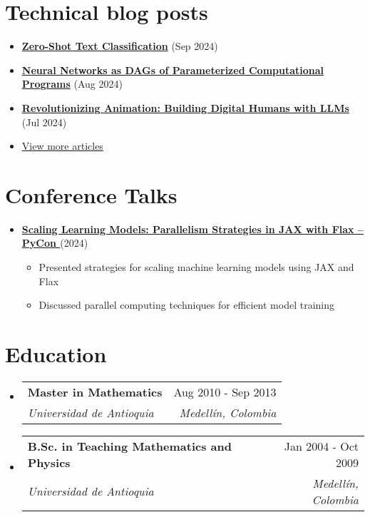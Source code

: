 \documentclass[letterpaper,11pt]{article}
\makeatletter
\newcommand{\resumeSubheading}[4]{
  \vspace{-2pt}
  \item[]
  \begin{tabular*}{\textwidth}{@{\extracolsep{\fill}}l r}
    \textbf{#1} & #2 \\
    \textit{#3} & \textit{#4} \\
  \end{tabular*}
  \vspace{-5pt}
}
\newcommand{\normalfaExternalLink}{{\mdseries\faExternalLink}}
\newcommand{\normalfaYoutube}{{\mdseries\faYoutube}}
\makeatother
\begin{document}
\section{Technical blog posts}
\begin{itemize}[leftmargin=*, itemsep=0pt]
    \item \textbf{\href{https://www.asanchezyali.com/blog/ai/20240917ZeroShot}{Zero-Shot Text Classification}} (Sep 2024)
    \item \textbf{\href{https://www.asanchezyali.com/blog/differentiable-programming/20240923DifferentiablePrograms}{Neural Networks as DAGs of Parameterized Computational Programs}} (Aug 2024)
    \item \textbf{\href{https://monadical.com/posts/build-a-digital-human-with-large-language-models.html}{Revolutionizing Animation: Building Digital Humans with LLMs}} (Jul 2024)
    \item \href{https://www.asanchezyali.com/}{View more articles \normalfaExternalLink}
\end{itemize}

\section{Conference Talks}
\begin{itemize}[leftmargin=*]
    \item \textbf{\href{https://www.youtube.com/watch?v=m4hP1soE414}{Scaling Learning Models: Parallelism Strategies in JAX with Flax -- PyCon \normalfaYoutube}} (2024)
    \begin{itemize}[itemsep=0pt]
        \item Presented strategies for scaling machine learning models using JAX and Flax
        \item Discussed parallel computing techniques for efficient model training
    \end{itemize}
\end{itemize}

\section{Education}
\begin{itemize}[leftmargin=0pt, itemindent=0pt, label={}]
\resumeSubheading
{Master in Mathematics}{Aug 2010 - Sep 2013}
{Universidad de Antioquia}{Medellín, Colombia}

\resumeSubheading
{B.Sc. in Teaching Mathematics and Physics}{Jan 2004 - Oct 2009}
{Universidad de Antioquia}{Medellín, Colombia}
\end{itemize}
\end{document}
